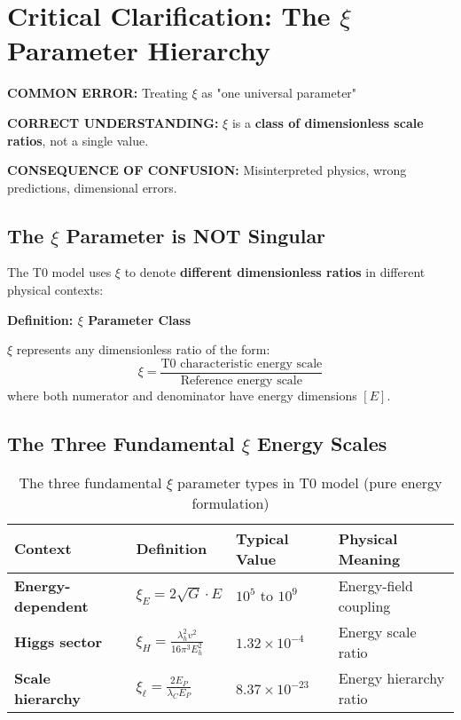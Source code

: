 \documentclass[12pt,a4paper]{article}
\begin{document}
\section{Critical Clarification: The $\xi$ Parameter Hierarchy}
\label{sec:xi_parameter_hierarchy}

\begin{tcolorbox}[colback=red!10!white,colframe=red!75!black,title=CRITICAL WARNING: $\xi$ Parameter Confusion]
	\textbf{COMMON ERROR:} Treating $\xi$ as "one universal parameter"
	
	\textbf{CORRECT UNDERSTANDING:} $\xi$ is a \textbf{class of dimensionless scale ratios}, not a single value.
	
	\textbf{CONSEQUENCE OF CONFUSION:} Misinterpreted physics, wrong predictions, dimensional errors.
\end{tcolorbox}

\subsection{The $\xi$ Parameter is NOT Singular}
\label{subsec:xi_not_singular}

The T0 model uses $\xi$ to denote \textbf{different dimensionless ratios} in different physical contexts:

\textbf{Definition: $\xi$ Parameter Class}

$\xi$ represents any dimensionless ratio of the form:
\begin{equation}
	\xi = \frac{\text{T0 characteristic energy scale}}{\text{Reference energy scale}}
\end{equation}
where both numerator and denominator have energy dimensions $[E]$.

\subsection{The Three Fundamental $\xi$ Energy Scales}
\label{subsec:three_xi_scales}

\begin{table}[htbp]
	\centering
	\begin{tabular}{|p{3cm}|p{4cm}|p{3cm}|p{4cm}|}
		\hline
		\textbf{Context} & \textbf{Definition} & \textbf{Typical Value} & \textbf{Physical Meaning} \\
		\hline
		\textbf{Energy-dependent} & $\xi_E = 2\sqrt{G} \cdot E$ & $10^5$ to $10^9$ & Energy-field coupling \\
		\hline
		\textbf{Higgs sector} & $\xi_H = \frac{\lambda_h^2 v^2}{16\pi^3 E_h^2}$ & $1.32 \times 10^{-4}$ & Energy scale ratio \\
		\hline
		\textbf{Scale hierarchy} & $\xi_\ell = \frac{2E_P}{\lambda_C E_P}$ & $8.37 \times 10^{-23}$ & Energy hierarchy ratio \\
		\hline
	\end{tabular}
	\caption{The three fundamental $\xi$ parameter types in T0 model (pure energy formulation)}
	\label{tab:xi_hierarchy}
\end{table}
\end{document}
